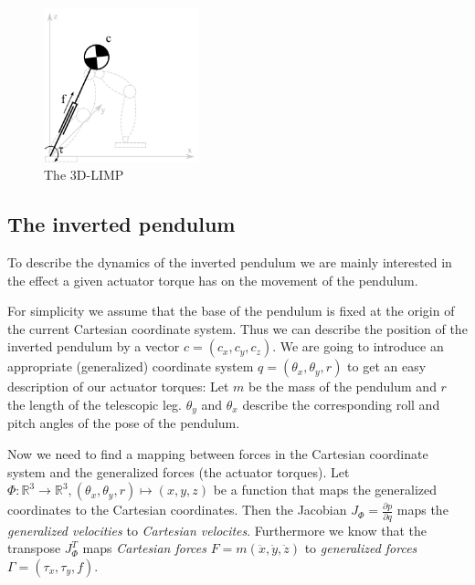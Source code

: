 \documentclass[english,ngerman]{KITreprt}
\begin{document}
\begin{figure}
  \begin{center}
     \includegraphics[width=0.4\textwidth]{images/3dlimp.png}
  \end{center}
  \caption{The 3D-LIMP}
\end{figure}

\subsection{The inverted pendulum}\label{the-inverted-pendulum}

To describe the dynamics of the inverted pendulum we are mainly
interested in the effect a given actuator torque has on the movement of
the pendulum.

For simplicity we assume that the base of the pendulum is fixed at the
origin of the current Cartesian coordinate system. Thus we can describe
the position of the inverted pendulum by a vector $c = (c_x, c_y, c_z)$.
We are going to introduce an appropriate (generalized) coordinate system
$q = (\theta_x, \theta_y, r)$ to get an easy description of our actuator
torques: Let $m$ be the mass of the pendulum and $r$ the length of the
telescopic leg. $\theta_y$ and $\theta_x$ describe the corresponding
roll and pitch angles of the pose of the pendulum.

Now we need to find a mapping between forces in the Cartesian coordinate
system and the generalized forces (the actuator torques). Let
$\Phi: \mathbb{R}^3 \longrightarrow \mathbb{R}^3, (\theta_x, \theta_y, r) \mapsto (x, y, z)$
be a function that maps the generalized coordinates to the Cartesian
coordinates. Then the Jacobian $J_\Phi = \frac{\partial p}{\partial q}$
maps the \emph{generalized velocities} to \emph{Cartesian velocites}.
Furthermore we know that the transpose $J_\Phi^T$ maps \emph{Cartesian
forces} $F = m (\ddot x, \ddot y, \ddot z)$ to \emph{generalized forces}
$\Gamma = (\tau_x, \tau_y, f)$.
\end{document}

